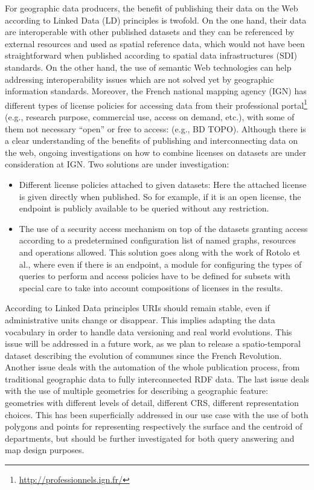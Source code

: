 For geographic data producers, the benefit of publishing their data on the Web according to Linked Data  (LD) principles is twofold. On the one hand, their data are interoperable with other published datasets and they can be referenced by external resources and used as spatial reference data, which would not have been straightforward when published according to spatial data infrastructures (SDI) standards. On the other hand, the use of semantic Web technologies can help addressing interoperability issues which are not solved yet by geographic information standards. 
Moreover, the French national mapping agency (IGN) has different types of license policies for accessing data from their professional portal\footnote{\url{http://professionnels.ign.fr/}}  (e.g., research purpose, commercial use, access on demand, etc.), with some of them not necessary ``open'' or free to access: (e.g., BD TOPO\circledR). Although there is a clear understanding of the benefits of publishing and interconnecting data on the web, ongoing investigations on how to combine licenses on datasets are under consideration at IGN. Two solutions are under investigation: 
\begin{itemize}
\item Different license policies attached to given datasets: Here the attached license is given directly when published. So for example, if it is an open license, the endpoint is publicly available to be queried without any restriction.
\item The use of a security access mechanism on top of the datasets granting access according to a predetermined configuration list of named graphs, resources and operations allowed. This solution goes along with the work of Rotolo et al.\cite{rotolo2013deontic}, where even if there is an endpoint, a module for configuring the types of queries to perform and access policies have to be defined for subsets with special care to take into account compositions of licenses in the results.
\end{itemize}
According to Linked Data principles URIs should remain stable, even if administrative units change or disappear. This implies adapting the data vocabulary in order to handle data versioning and real world evolutions. This issue will be addressed in a future work, as we plan to release a spatio-temporal dataset describing the evolution of communes since the French Revolution. Another issue deals with the automation of the whole publication process, from traditional geographic data to fully interconnected RDF data.
The last issue deals with the use of multiple geometries for describing a geographic feature: geometries with different levels of detail, different CRS, different representation choices. This has been superficially addressed in our use case with the use of both polygons and points for representing respectively the surface and the centroid of departments, but should be further investigated for both query answering and map design purposes.


